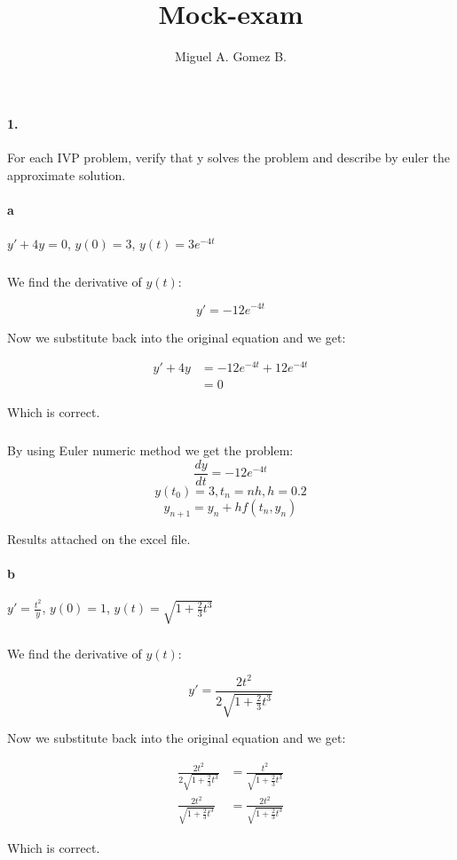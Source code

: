 \documentclass{article}
\title{Mock-exam}
\author{Miguel A. Gomez B.}
\begin{document}
\maketitle

\paragraph{1.} For each IVP problem, verify that y solves the problem and describe by euler the approximate solution.

\paragraph{a} $y'+ 4y =0$, $y(0)=3$, $y(t) = 3e^{-4t}$

\subparagraph{} We find the derivative of $y(t)$:

\[
    y' = -12e^{-4t}
\]

Now we substitute back into the original equation and we get:

\begin{align*}
    y'+ 4y &= -12e^{-4t} + 12e^{-4t}\\
    &= 0
\end{align*}

Which is correct.

\subparagraph{} By using Euler numeric method we get the problem:
\[
    \frac{dy}{dt} = -12e^{-4t}
\]
\[
    y(t_0) = 3, t_n = nh, h = 0.2
\]
\[
    y_{n+1} = y_n + hf(t_n,y_n)
\]

Results attached on the excel file.

\paragraph{b} $y' = \frac{t^{2}}{y}$, $y(0)=1$, $y(t) = \sqrt{1 + \frac{2}{3}t^{3}}$

\subparagraph{} We find the derivative of $y(t)$:

\[
    y' = \frac{2t^2}{2\sqrt{1+\frac{2}{3}t^{3}}}
\]

Now we substitute back into the original equation and we get:

\begin{align*}
    \frac{2t^2}{2\sqrt{1+\frac{2}{3}t^{3}}} &= \frac{t^2}{\sqrt{1 + \frac{2}{3}t^{3}}}\\
    \frac{2t^2}{ \sqrt{1+\frac{2}{3}t^{3}}}&= \frac{2t^2}{\sqrt{1 + \frac{2}{3}t^{3}}}
\end{align*}

Which is correct.
\end{document}
